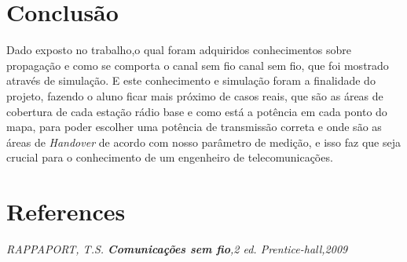 \documentclass[12pt]{article}
\begin{document}
\section{Conclusão}
Dado exposto no trabalho,o qual foram adquiridos conhecimentos sobre propagação e como se comporta o canal sem fio canal sem fio, que foi mostrado através de simulação. E este conhecimento e simulação foram a finalidade do projeto, fazendo o aluno ficar mais próximo de casos reais, que são as áreas de cobertura de cada estação rádio base e como está a potência em cada ponto do mapa, para poder escolher uma potência de transmissão correta e onde são as áreas de \textit{Handover} de acordo com nosso parâmetro de medição, e isso faz que seja crucial para o conhecimento de um engenheiro de telecomunicações.
\section{References}

\textit{ RAPPAPORT, T.S.\textbf{ Comunicações sem fio},2 ed. Prentice-hall,2009}
\end{document}
